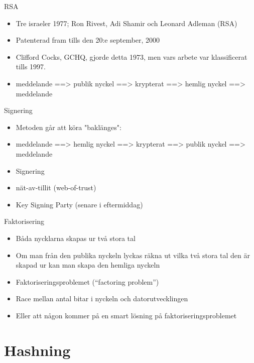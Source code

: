 \documentclass{beamer}
\begin{document}
\begin{frame}{RSA}
\begin{itemize}
\item Tre israeler 1977; Ron Rivest, Adi Shamir och Leonard Adleman (RSA)
\pause \item Patenterad fram tills den 20:e september, 2000
\pause \item Clifford Cocks, GCHQ, gjorde detta 1973, men vars arbete var klassificerat tills 1997.
\pause \item meddelande 
\pause ==> publik nyckel 
\pause ==> krypterat
\pause ==> hemlig nyckel 
\pause ==> meddelande
\end{itemize}
\end{frame}

\begin{frame}{Signering}
\begin{itemize}
\item Metoden går att köra "baklänges":
\pause \item meddelande 
\pause ==> hemlig nyckel 
\pause ==> krypterat
\pause ==> publik nyckel 
\pause ==> meddelande
\pause \item Signering
\pause \item nät-av-tillit (web-of-trust)
\pause \item Key Signing Party (senare i eftermiddag)
\end{itemize}
\end{frame}


\begin{frame}{Faktorisering}
\begin{itemize}
\item Båda nycklarna skapas ur två stora tal
\pause \item Om man från den publika nyckeln lyckas räkna ut vilka två stora tal den är 
skapad ur kan man skapa den hemliga nyckeln
\pause \item Faktoriseringsproblemet (``factoring problem'')
\pause \item Race mellan antal bitar i nyckeln och datorutvecklingen
\pause \item Eller att någon kommer på en smart lösning på faktoriseringsproblemet
\end{itemize} 
\end{frame}


\section{Hashning}
\end{document}
